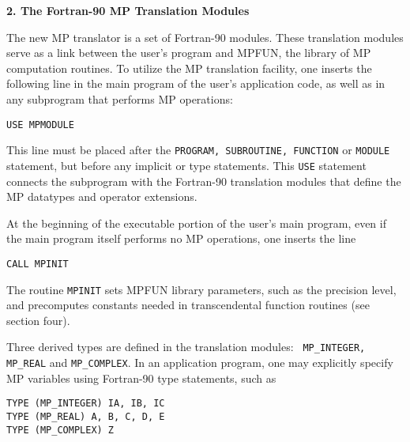 \vspace{2ex} \noindent
{\bf 2. The Fortran-90 MP Translation Modules}

The new MP translator is a set of Fortran-90 modules.  These
translation modules serve as a link between the user's program and
MPFUN, the library of MP computation routines.  To utilize the MP
translation facility, one inserts the following line in the main
program of the user's application code, as well as in any subprogram
that performs MP operations:

\begin{tt} \begin{small} \begin{verbatim}
USE MPMODULE
\end{verbatim} \end{small} \end{tt}

\noindent
This line must be placed after the {\tt PROGRAM, SUBROUTINE, FUNCTION}
or {\tt MODULE} statement, but before any implicit or type statements.
This {\tt USE} statement connects the subprogram with the Fortran-90
translation modules that define the MP datatypes and operator
extensions.

At the beginning of the executable portion of the user's main program,
even if the main program itself performs no MP operations, one inserts
the line

\begin{tt} \begin{small} \begin{verbatim}
CALL MPINIT
\end{verbatim} \end{small} \end{tt}

\noindent
The routine {\tt MPINIT} sets MPFUN library parameters, such as the
precision level, and precomputes constants needed in transcendental
function routines (see section four).

Three derived types are defined in the translation modules: {\tt
MP\_INTEGER, MP\_REAL} and {\tt MP\_COMPLEX}.  In an application
program, one may explicitly specify MP variables using Fortran-90 type
statements, such as

\begin{tt} \begin{small} \begin{verbatim}
TYPE (MP_INTEGER) IA, IB, IC
TYPE (MP_REAL) A, B, C, D, E
TYPE (MP_COMPLEX) Z
\end{verbatim} \end{small} \end{tt}

